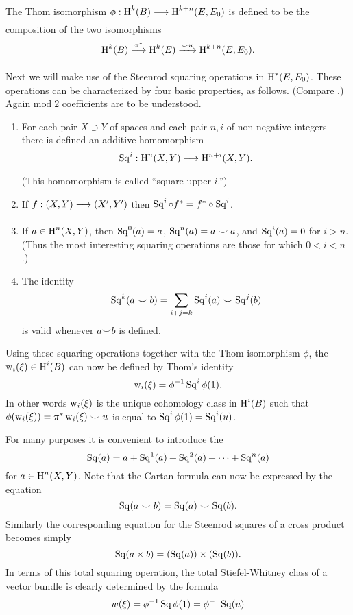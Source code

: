 \documentclass[../main]{subfiles}
\begin{document}
\begin{definition}
\label{def:08.02}
The Thom isomorphism $\phi:{\homology^{k}(\B )}\varrightarrow{}{\homology^{k+ n }(\total, \total_{0})}$ is defined to be the composition of the two isomorphisms
\[\homology^{k}(\B) \varrightarrow{\pi^\ast} \homology^{k}(\total) \varrightarrow{\smile u} \homology^{k+n}(\total, \total_{0}).\]
\end{definition}
Next we will make use of the Steenrod squaring operations in $\operatorname{H}^{\ast}(E, E_{0})$. These operations can be characterized by four basic properties, as follows. (Compare \cite{steenrod1962cohomology}.) Again $\mathrm{mod}\; 2$ coefficients are to be understood.
\begin{enumerate}[label=(\arabic*)]
    \item\label{8.2.1} For each pair $X \supset Y$ of spaces and each pair $n,i$ of non-negative integers there is defined an additive homomorphism
	\[
	\steenrod^{i}:\homology^{ n }(X, Y)\varrightarrow{}\homology^{n+i}(X, Y).
	\]
	(This homomorphism is called ``square upper $i$.'')
	\item\label{8.2.2}  If $f:(X,Y)\varrightarrow{}(X',Y')$ then $\operatorname{Sq}^{i} \circ f^{\ast}=f^{\ast} \circ \operatorname{Sq}^{i}$.
	\item\label{8.2.3} If $a \in \operatorname{H}^{n}(X, Y)$, then $\operatorname{Sq}^{0}(a)=a$, $\operatorname{Sq}^{ n }(a)=a \smile a$, and $\operatorname{Sq}^{i}(a)=0$ for $i>n$. (Thus the most interesting squaring operations are those for which $0<i<n$.)
	\item\label{8.2.4}  The identity
	\[\operatorname{Sq}^{k}(a \smile b)=\sum_{i+j=k} \operatorname{Sq}^{i}(a) \smile \operatorname{Sq}^{j}(b)\]
	is valid whenever $a \smile b$ is defined. 
\end{enumerate}
Using these squaring operations together with the Thom isomorphism $\phi$, the  $\operatorname{w}_{i}(\xi) \in \operatorname{H}^{i}(B )$ can now be defined by Thom's identity \label{ch08:thoms identity} %
\[
\operatorname{w}_{i}(\xi)=\phi^{-1} \operatorname{Sq}^{i} \phi(1).
\]
In other words $\operatorname{w}_{i}(\xi)$ is the unique cohomology class in $\operatorname{H}^{i}(B )$ such that \newline $\phi(\operatorname{w}_{i}(\xi))=\pi^{*} \operatorname{w}_{i}(\xi) \smile u$ is equal to $\operatorname{Sq}^{i} \phi(1)=\operatorname{Sq}^{i}(u)$.

For many purposes it is convenient to introduce the 
\[
\operatorname{Sq}(a)=a+\operatorname{Sq}^{1}(a)+\operatorname{Sq}^{2}(a)+\dots+\operatorname{Sq}^{ n }(a)
\]
for $a \in \operatorname{H}^{ n }(X, Y)$. Note that the Cartan formula can now be expressed by the equation
\[
\operatorname{Sq}(a \smile b)=\operatorname{Sq}( a) \smile\operatorname{Sq}( b).
\]
Similarly the corresponding equation for the Steenrod squares of a cross product becomes simply
\[
\operatorname{Sq}(a \times b)=(\operatorname{Sq} (a)) \times(\operatorname{Sq} (b)).
\]
In terms of this total squaring operation, the total Stiefel-Whitney class of a vector bundle is clearly determined by the formula
\[
w(\xi)=\phi^{-1} \operatorname{Sq} \phi(1)=\phi^{-1} \operatorname{Sq}(u)
\]\newpage
\end{document}
